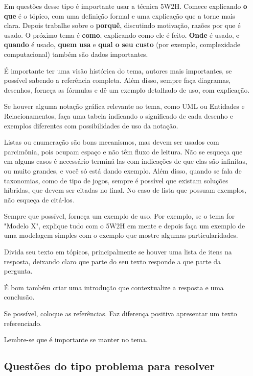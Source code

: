 \documentclass[12pt]{article}
\begin{document}
Em questões desse tipo é importante usar a técnica 5W2H. Comece explicando \textbf{o que} é o tópico, com uma definição formal e uma explicação que a torne mais clara. Depois trabalhe sobre o \textbf{porquê}, discutindo motivação, razões por que é usado. O próximo tema é \textbf{como}, explicando como ele é feito. \textbf{Onde} é usado, e \textbf{quando} é usado, \textbf{quem usa} e \textbf{qual o seu custo} (por exemplo, complexidade computacional) também são dados importantes.

É importante ter uma visão histórica do tema, autores mais importantes, se possível sabendo a referência completa. Além disso, sempre faça diagramas, desenhos, forneça as fórmulas e dê um exemplo detalhado de uso, com explicação.

Se houver alguma notação gráfica relevante ao tema, como UML ou Entidades e Relacionamentos, faça uma tabela indicando o significado de cada desenho e exemplos diferentes com possibilidades de uso da notação.

Listas ou enumeração são bons mecanismos, mas devem ser usados com parcimônia, pois ocupam espaço e não têm fluxo de leitura. Não se esqueça que em alguns casos é necessário terminá-las com indicações de que elas são infinitas, ou muito grandes, e você só está dando exemplo. Além disso, quando se fala de taxonomias, como de tipo de jogos, sempre é possível que existam soluções híbridas, que devem ser citadas no final. No caso de lista que possuam exemplos, não esqueça de citá-los.

Sempre que possível, forneça um exemplo de uso. Por exemplo, se o tema for "Modelo X", explique tudo com o 5W2H em mente e depois faça um exemplo de uma modelagem simples com o exemplo que mostre algumas particularidades.

Divida seu texto em tópicos, principalmente se houver uma lista de itens na resposta, deixando claro que parte do seu texto responde a que parte da pergunta.

É bom também criar uma introdução que contextualize a resposta e uma conclusão.

Se possível, coloque as referências. Faz diferença positiva apresentar um texto referenciado.

Lembre-se que é importante se manter no tema.

\subsection{Questões do tipo problema para resolver}
\end{document}

